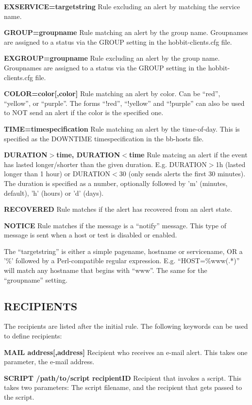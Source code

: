  \textbf{EXSERVICE=targetstring}
 Rule excluding an alert by matching the service name. 


 \textbf{GROUP=groupname}
 Rule matching an alert by the group name. Groupnames are assigned to a status via the GROUP setting in the hobbit-clients.cfg file. 


 \textbf{EXGROUP=groupname}
 Rule excluding an alert by the group name. Groupnames are assigned to a status via the GROUP setting in the hobbit-clients.cfg file. 


 \textbf{COLOR=color[,color]}
 Rule matching an alert by color. Can be ``red'', ``yellow'', or ``purple''. The forms ``!red'', ``!yellow'' and ``!purple'' can also be used to NOT send an alert if the color is the specified one. 


 \textbf{TIME=timespecification}
 Rule matching an alert by the time-of-day. This is specified as the DOWNTIME timespecification in the bb-hosts file. 


 \textbf{DURATION$>$time, DURATION$<$time}
 Rule matcing an alert if the event has lasted longer/shorter than the given duration. E.g. DURATION$>$1h (lasted longer than 1 hour) or DURATION$<$30 (only sends alerts the first 30 minutes). The duration is specified as a number, optionally followed by 'm' (minutes, default), 'h' (hours) or 'd' (days). 


 \textbf{RECOVERED}
 Rule matches if the alert has recovered from an alert state. 


 \textbf{NOTICE}
 Rule matches if the message is a ``notify'' message. This type of message is sent when a host or test is disabled or enabled. 


  The ``targetstring'' is either a simple pagename, hostname or servicename, OR a '\%' followed by a Perl-compatible regular expression. E.g. ``HOST=\%www(.*)'' will match any hostname that begins with ``www''. The same for the ``groupname'' setting. 


 
\subsection{RECIPIENTS}
 The recipients are listed after the initial rule. The following keywords can be used to define recipients: 

 \textbf{MAIL address[,address]}
 Recipient who receives an e-mail alert. This takes one parameter, the e-mail address. 


 \textbf{SCRIPT /path/to/script recipientID}
 Recipient that invokes a script. This takes two parameters: The script filename, and the recipient that gets passed to the script. 


